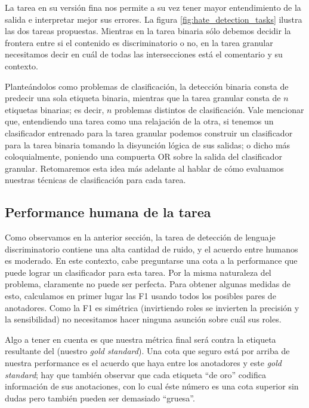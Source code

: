 La tarea en su versión fina nos permite a su vez tener mayor entendimiento de la salida e interpretar mejor sus errores. La figura \ref{fig:hate_detection_tasks} ilustra las dos tareas propuestas. Mientras en la tarea binaria sólo debemos decidir la frontera entre si el contenido es discriminatorio o no, en la tarea granular necesitamos decir en cuál de todas las intersecciones está el comentario y su contexto.

Planteándolos como problemas de clasificación, la detección binaria consta de predecir una sola etiqueta binaria, mientras que la tarea granular consta de $n$ etiquetas binarias; es decir, $n$ problemas distintos de clasificación. Vale mencionar que, entendiendo una tarea como una relajación de la otra, si tenemos un clasificador entrenado para la tarea granular podemos construir un clasificador para la tarea binaria tomando la disyunción lógica de sus salidas; o dicho más coloquialmente, poniendo una compuerta OR sobre la salida del clasificador granular. Retomaremos esta idea más adelante al hablar de cómo evaluamos nuestras técnicas de clasificación para cada tarea.




\subsection{Performance humana de la tarea}


Como observamos en la anterior sección, la tarea de detección de lenguaje discriminatorio contiene una alta cantidad de ruido, y el acuerdo entre humanos es moderado. En este contexto, cabe preguntarse una cota a la performance que puede lograr un clasificador para esta tarea. Por la misma naturaleza del problema, claramente no puede ser perfecta. Para obtener algunas medidas de esto, calculamos en primer lugar las F1 usando todos los posibles pares de anotadores. Como la F1 es simétrica (invirtiendo roles se invierten la precisión y la sensibilidad) no necesitamos hacer ninguna asunción sobre cuál sus roles.

Algo a tener en cuenta es que nuestra métrica final será contra la etiqueta resultante del (nuestro \emph{gold standard}). Una cota que seguro está por arriba de nuestra performance es el acuerdo que haya entre los anotadores y este \emph{gold standard}; hay que también observar que cada etiqueta ``de oro'' codifica información de sus anotaciones, con lo cual éste número es una cota superior sin dudas pero también pueden ser demasiado ``gruesa''.

